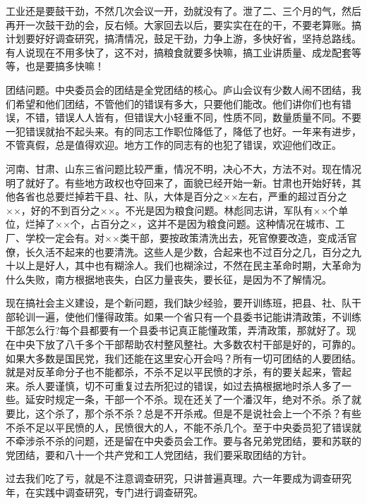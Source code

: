 工业还是要鼓干劲，不然几次会议一开，劲就没有了。泄了二、三个月的气，然后再开一次鼓干劲的会，反右倾。大家回去以后，要实实在在的干，不要老算账。搞计划要好好调查研究，搞清情况，鼓足干劲，力争上游，多快好省，坚持总路线。有人说现在不用多快了，这不对，搞粮食就要多快嘛，搞工业讲质量、成龙配套等等，也是要搞多快嘛！

团结问题。中央委员会的团结是全党团结的核心。庐山会议有少数人闹不团结，我们希望和他们团结，不管他们的错误有多大，只要他们能改。他们讲你们也有错误，不错，错误人人皆有，但错误大小轻重不同，性质不同，数量质量不同。不要一犯错误就抬不起头来。有的同志工作职位降低了，降低了也好。一年来有进步，不管真假，总是值得欢迎。地方工作的同志有的也犯了错误，欢迎他们改正。

河南、甘肃、山东三省问题比较严重，情况不明，决心不大，方法不对。现在情况明了就好了。有些地方政权也夺回来了，面貌已经开始一新。甘肃也开始好转，其他各省也总要烂掉若干县、社、队，大体是百分之××左右，严重的超过百分之××，好的不到百分之××。不光是因为粮食问题。林彪同志讲，军队有××个单位，烂掉了××个，占百分之×，这并不是因为粮食问题。这种情况在城市、工厂、学校一定会有。对××类干部，要按政策清洗出去，死官僚要改造，变成活官僚，长久活不起来的也要清洗。这些人是少数，合起来也不过百分之几，百分之九十以上是好人，其中也有糊涂人。我们也糊涂过，不然在民主革命时期，大革命为什么失败，南方根据地丧失，白区力量丧失，要长征，是因为不了解情况。

现在搞社会主义建设，是个新问题，我们缺少经验，要开训练班，把县、社、队干部轮训一遍，使他们懂得政策。如果一个省只有一个县委书记能讲清政策，不训练干部怎么行?每个县都要有一个县委书记真正能懂政策，弄清政策，那就好了。现在中央下放了八千多个干部帮助农村整风整社。大多数农村干部是好的，可靠的。如果大多数是国民党，我们还能在这里安心开会吗？所有一切可团结的人要团结。就是对反革命分子也不能都杀，不杀不足以平民愤的才杀，有的要关起来，管起来。杀人要谨慎，切不可重复过去所犯过的错误，如过去搞根据地时杀人多了一些。延安时规定一条，干部一个不杀。现在还关了一个潘汉年，绝对不杀。杀了就要比，这个杀了，那个杀不杀？总是不开杀戒。但是不是说社会上一个不杀？有些不杀不足以平民愤的人，民愤很大的人，不能不杀几个。至于中央委员犯了错误就不牵涉杀不杀的问题，还是留在中央委员会工作。要与各兄弟党团结，要和苏联的党团结，要和八十一个共产党和工人党团结，我们要采取团结的方针。

过去我们吃了亏，就是不注意调查研究，只讲普遍真理。六一年要成为调查研究年，在实践中调查研究，专门进行调查研究。


